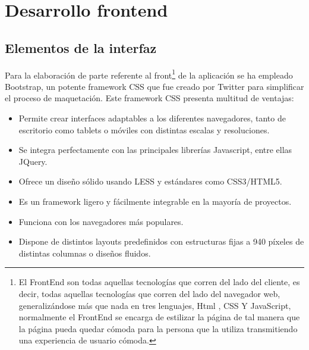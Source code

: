 

\chapter{ Desarrollo frontend }

\label{chap:desarrollo-frontend}

\section {Elementos de la interfaz}

Para la elaboración de parte referente al front\footnote{ El FrontEnd son todas aquellas tecnologías que corren del lado del cliente, es decir, todas aquellas tecnologías que corren del lado del 
navegador web, generalizándose más que nada en tres lenguajes, Html , CSS Y JavaScript, normalmente el FrontEnd se encarga de estilizar la página de tal manera que la página pueda quedar cómoda 
para la persona que la utiliza transmitiendo una experiencia de usuario cómoda.} de la aplicación se ha empleado Bootstrap, un potente framework CSS que fue creado por Twitter para simplificar el
proceso de maquetación. Este framework CSS presenta multitud de ventajas:

\begin{itemize}
  \item Permite crear interfaces adaptables a los diferentes navegadores, tanto de escritorio como tablets o móviles con distintas escalas y resoluciones.

  \item Se integra perfectamente con las principales librerías Javascript, entre ellas JQuery.

  \item Ofrece un diseño sólido usando LESS y estándares como CSS3/HTML5.

  \item Es un framework ligero y fácilmente integrable en la mayoría de proyectos.

  \item Funciona con los navegadores más populares.

  \item Dispone de distintos layouts predefinidos con estructuras fijas a 940 píxeles de distintas columnas o diseños fluidos.
\end{itemize}

